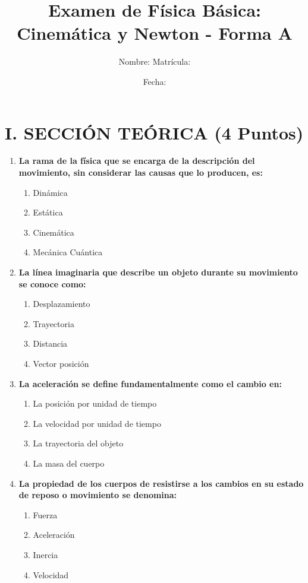 \documentclass[12pt]{article}
\title{Examen de Física Básica: Cinemática y Newton - Forma A}
\author{Nombre: \underline{\hspace{8cm}} \quad Matrícula: \underline{\hspace{3cm}}}
\date{Fecha: \underline{\hspace{4cm}}}
\begin{document}
\maketitle

\section*{I. SECCIÓN TEÓRICA (4 Puntos)}

\begin{enumerate}[label=\arabic*.]
    \item \textbf{La rama de la física que se encarga de la descripción del movimiento, sin considerar las causas que lo producen, es:}
    \begin{enumerate}[label=\alph*)]
        \item Dinámica
        \item Estática
        \item Cinemática
        \item Mecánica Cuántica
    \end{enumerate}

    \item \textbf{La línea imaginaria que describe un objeto durante su movimiento se conoce como:}
    \begin{enumerate}[label=\alph*)]
        \item Desplazamiento
        \item Trayectoria
        \item Distancia
        \item Vector posición
    \end{enumerate}

    \item \textbf{La aceleración se define fundamentalmente como el cambio en:}
    \begin{enumerate}[label=\alph*)]
        \item La posición por unidad de tiempo
        \item La velocidad por unidad de tiempo
        \item La trayectoria del objeto
        \item La masa del cuerpo
    \end{enumerate}

    \item \textbf{La propiedad de los cuerpos de resistirse a los cambios en su estado de reposo o movimiento se denomina:}
    \begin{enumerate}[label=\alph*)]
        \item Fuerza
        \item Aceleración
        \item Inercia
        \item Velocidad
    \end{enumerate}
\end{enumerate}
\end{document}
